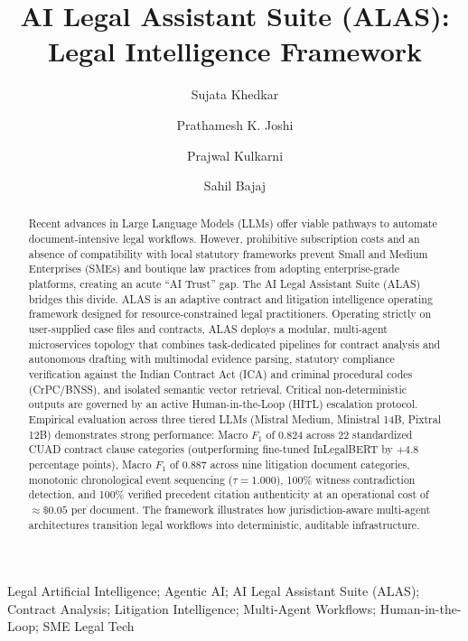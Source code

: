 \documentclass[3p,times,procedia]{elsarticle}
\begin{document}
\begin{frontmatter}


\title{AI Legal Assistant Suite (ALAS): Legal Intelligence Framework}

\author[vesit]{Sujata Khedkar}
\author[vesit]{Prathamesh K. Joshi}
\author[vesit]{Prajwal Kulkarni}
\author[vesit]{Sahil Bajaj}

\address[vesit]{Vivekanand Education Society's Institute of Technology, Mumbai, India}

\begin{abstract}
Recent advances in Large Language Models (LLMs) offer viable pathways to automate document-intensive legal workflows. However, prohibitive subscription costs and an absence of compatibility with local statutory frameworks prevent Small and Medium Enterprises (SMEs) and boutique law practices from adopting enterprise-grade platforms, creating an acute ``AI Trust'' gap. The AI Legal Assistant Suite (ALAS) bridges this divide. ALAS is an adaptive contract and litigation intelligence operating framework designed for resource-constrained legal practitioners. Operating strictly on user-supplied case files and contracts, ALAS deploys a modular, multi-agent microservices topology that combines task-dedicated pipelines for contract analysis and autonomous drafting with multimodal evidence parsing, statutory compliance verification against the Indian Contract Act (ICA) and criminal procedural codes (CrPC/BNSS), and isolated semantic vector retrieval. Critical non-deterministic outputs are governed by an active Human-in-the-Loop (HITL) escalation protocol. Empirical evaluation across three tiered LLMs (Mistral Medium, Ministral 14B, Pixtral 12B) demonstrates strong performance: Macro $F_1$ of 0.824 across 22 standardized CUAD contract clause categories (outperforming fine-tuned InLegalBERT by $+4.8$ percentage points), Macro $F_1$ of 0.887 across nine litigation document categories, monotonic chronological event sequencing ($\tau = 1.000$), 100\% witness contradiction detection, and 100\% verified precedent citation authenticity at an operational cost of $\approx \$0.05$ per document. The framework illustrates how jurisdiction-aware multi-agent architectures transition legal workflows into deterministic, auditable infrastructure.
\end{abstract}

\begin{keyword}
Legal Artificial Intelligence; Agentic AI; AI Legal Assistant Suite (ALAS); Contract Analysis; Litigation Intelligence; Multi-Agent Workflows; Human-in-the-Loop; SME Legal Tech
\end{keyword}

\end{frontmatter}
\end{document}
